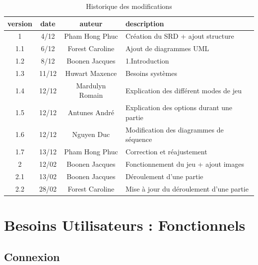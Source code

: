 \documentclass[10pt, a4paper]{article}
\begin{document}
		\begin{table}[h!]

			\centering

			\begin{tabular}{|c|c|c|p{50mm}|}
				\hline
				 \textbf{version} & \textbf{date} & \textbf{auteur}  & \textbf{description} \\ \hline
				 1 & 4/12 & Pham Hong Phuc & Création du SRD + ajout structure\\
				 1.1 & 6/12 & Forest Caroline & Ajout de diagrammes UML\\
				 1.2 & 8/12 & Boonen Jacques & 1.Introduction\\
				 1.3 & 11/12 & Huwart Maxence & Besoins systèmes\\
				 1.4 & 12/12 & Mardulyn Romain & Explication des différent modes de jeu\\
				 1.5 & 12/12 & Antunes André & Explication des options durant une partie\\
         1.6 & 12/12 & Nguyen Duc & Modification des diagrammes de séquence\\
         1.7 & 13/12 & Pham Hong Phuc & Correction et réajustement \\ \hline
				 2 & 12/02 & Boonen Jacques & Fonctionnement du jeu + ajout images \\
				 2.1 & 13/02 & Boonen Jacques & Déroulement d'une partie \\
				 2.2 & 28/02 & Forest Caroline & Mise à jour du déroulement d'une partie \\
				\hline
\end{tabular}
			\caption*{Historique des modifications}
			\end{table}
\clearpage


\section{Besoins Utilisateurs : Fonctionnels}


\subsection{Connexion}
\end{document}
